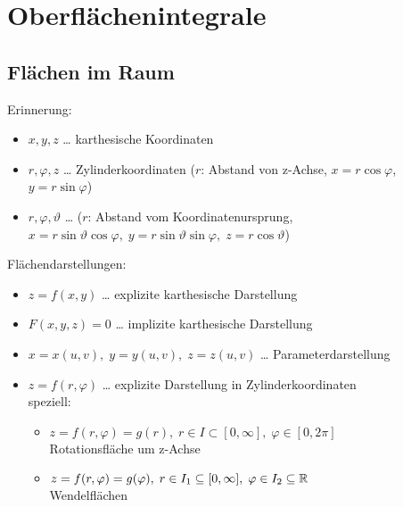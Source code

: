 \section{Oberflächenintegrale}
\subsection{Flächen im Raum}
Erinnerung:
\begin{itemize}
\item $x,y,z$ … karthesische Koordinaten
\item $r, \varphi, z$ … Zylinderkoordinaten ($r$: Abstand von z-Achse, $x=r\cos \varphi$, $y=r\sin \varphi$)
\item $r, \varphi, \vartheta$ … ($r$: Abstand vom Koordinatenursprung, $x=r\sin \vartheta \cos \varphi, \;y=r\sin\vartheta\sin\varphi, \;z=r\cos\vartheta$)
\end{itemize}
Flächendarstellungen:
\begin{itemize}
\item $z=f(x,y)$ … explizite karthesische Darstellung
\item $F(x,y,z)=0$ … implizite karthesische Darstellung
\item $x=x(u,v), \; y=y(u,v), \; z=z(u,v)$ … Parameterdarstellung
\item $z=f(r,\varphi)$ … explizite Darstellung in Zylinderkoordinaten\\
speziell:
\begin{itemize}
\item $z=f(r,\varphi)=g(r), \; r\in I\subset [0,\infty], \; \varphi\in[0,2\pi]$\\
Rotationsfläche um z-Achse
\item $z=f(r,\varphi)=g(\varphi), \; r \in I_1\subseteq[0,\infty], \; \varphi \in I_2\subseteq \mathbb{R}$\\
Wendelflächen
\end{itemize}
\end{itemize}

